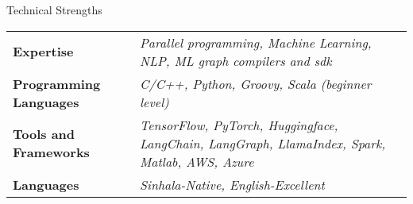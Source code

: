 \documentclass[
	11pt, %
]{./assets/resume} %
\begin{document}





\begin{rSection}{Technical Strengths}

	\def\arraystretch{1.5}

	\begin{tabular}{ l p{10cm}}
		\textbf{Expertise} & \emph{Parallel programming, Machine Learning, NLP, ML graph compilers and sdk} \\
		\textbf{Programming Languages} & \emph{C/C++, Python, Groovy, Scala (beginner level)} \\
		\textbf{Tools and Frameworks} & \emph{TensorFlow, PyTorch, Huggingface, LangChain, LangGraph, LlamaIndex, Spark, Matlab, AWS, Azure} \\
		\textbf{Languages} & \emph{Sinhala-Native, English-Excellent} \\
	\end{tabular}

\end{rSection}
\end{document}
